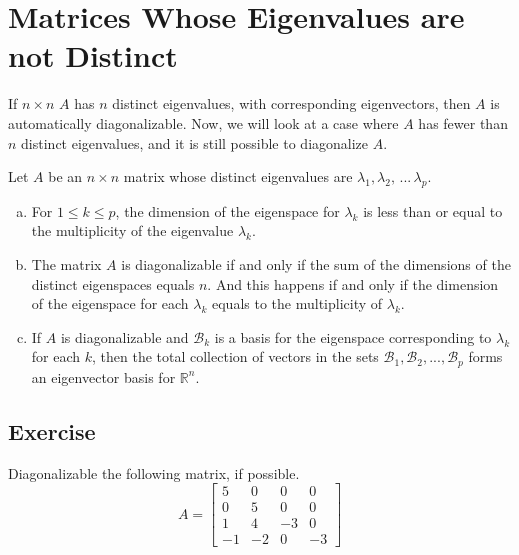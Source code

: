 \documentclass[aima104_lecturenotes_ku.tex]{subfiles}
\begin{document}
\section{Matrices Whose Eigenvalues are not Distinct}
If $n\times n$ $A$ has $n$ distinct eigenvalues, with corresponding eigenvectors, then $A$ is automatically diagonalizable. Now, we will look at a case where $A$ has fewer than $n$ distinct eigenvalues, and it is still possible to diagonalize $A$.

\begin{theorem}
  Let $A$ be an $n \times n$ matrix whose distinct eigenvalues are $\lambda_1, \lambda_2,\, ...\, \lambda_p$.
  \begin{enumerate}[a. ]
  \item For $1 \leq k \leq p$, the dimension of the eigenspace for $\lambda_k$ is less than or equal to the multiplicity of the eigenvalue $\lambda_k$.
  \item The matrix $A$ is diagonalizable if and only if the sum of the dimensions of the distinct eigenspaces equals $n$. And this happens if and only if the dimension of the eigenspace for each $\lambda_k$ equals to the multiplicity of $\lambda_k$.
   \item If $A$ is diagonalizable and $\mathcal{B}_k$ is a basis for the eigenspace corresponding to $\lambda_k$ for each $k$, then the total collection of vectors in the sets $\mathcal{B}_1, \mathcal{B}_2, ..., \mathcal{B}_p$ forms an eigenvector basis for $\mathbb{R}^n$.
  \end{enumerate}
\end{theorem}

\subsection{Exercise}
Diagonalizable the following matrix, if possible.
$$A=
\begin{bmatrix}
  5 & 0 & 0 & 0 \\
  0 & 5 & 0 & 0 \\
  1 & 4 & -3 & 0 \\
  -1 & -2 & 0 & -3
\end{bmatrix}
$$
\end{document}
